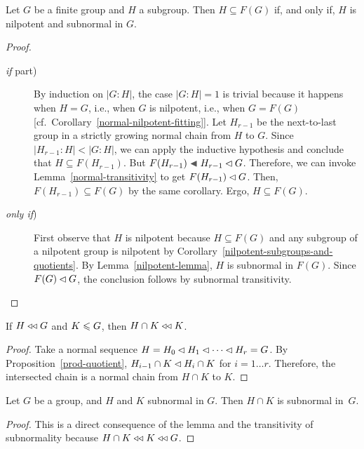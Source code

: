 \begin{thm}\label{nilpotent-and-subnormal}
    Let\/ $G$ be a finite group and\/ $H$ a subgroup. Then $H\subseteq F(G)$ if, and only if, $H$ is nilpotent and subnormal in\/ $G$.
\end{thm}

\begin{proof}${}$

\begin{description}
    \item[\rm{\it if\/} part)] By induction on $|G:H|$, the case $|G:H|=1$ is trivial because it happens when $H=G$, i.e., when $G$ is nilpotent, i.e., when $G=F(G)$ [cf.~Corollary~\ref{normal-nilpotent-fitting}]. Let $H_{r-1}$ be the next-to-last group in a strictly growing normal chain from $H$ to $G$. Since $|H_{r-1}:H|< |G:H|$, we can apply the inductive hypothesis and conclude that $H\subseteq F(H_{r-1})$. But $F(H_{r-1})\ch H_{r-1}\normal G$. Therefore, we can invoke Lemma~\ref{normal-transitivity} to get $F(H_{r-1})\lhd G$. Then, $F(H_{r-1})\subseteq F(G)$ by the same corollary. Ergo, $H\subseteq F(G)$.

    \item[\rm{\it only if\/})] First observe that $H$ is nilpotent because $H\subseteq F(G)$ and any subgroup of a nilpotent group is nilpotent by Corollary~\ref{nilpotent-subgroups-and-quotients}. By Lemma~\ref{nilpotent-lemma}, $H$ is subnormal in $F(G)$. Since $F(G)\lhd G$, the conclusion follows by subnormal transitivity.
\end{description}
\end{proof}

\begin{lem}\label{subnormal-restriction}
     If\/ $H \mathrel{\triangleleft\triangleleft} G$ and $K \leqslant G$, then $H\cap K \mathrel{\triangleleft\triangleleft} K$.
\end{lem}

\begin{proof} Take a normal sequence $H=H_0\lhd H_1\lhd\cdots\lhd H_r=G$. By Proposition~\ref{prod-quotient}, $H_{i-1}\cap K\lhd H_i\cap K$ for $i=1\dots r$. Therefore, the intersected chain is a normal chain from $H\cap K$ to $K$.  \end{proof}

\begin{prop}
    Let\/ $G$ be a group, and\/ $H$ and\/ $K$ subnormal in\/ $G$. Then $H\cap K$ is subnormal in\/~$G$.
\end{prop}

\begin{proof} This is a direct consequence of the lemma and the transitivity of subnormality because $H\cap K\mathrel{\triangleleft\triangleleft} K\mathrel{\triangleleft\triangleleft} G$.  \end{proof}


